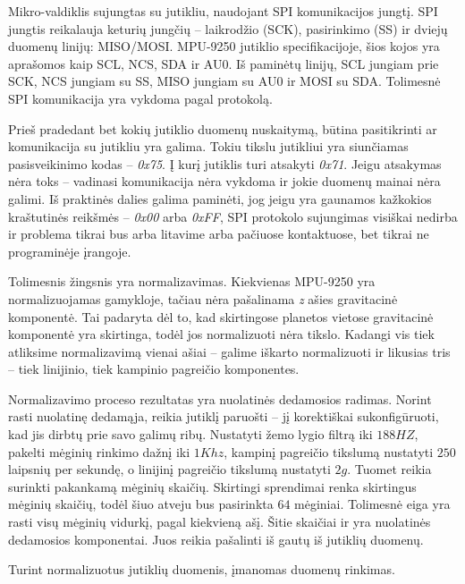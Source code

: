 Mikro-valdiklis sujungtas su jutikliu, naudojant SPI komunikacijos jungtį.
SPI jungtis reikalauja keturių jungčių -- laikrodžio (SCK), pasirinkimo (SS) ir dviejų duomenų linijų: MISO/MOSI.
MPU-9250 jutiklio specifikacijoje, šios kojos yra aprašomos kaip SCL, NCS, SDA ir AU0.
Iš paminėtų linijų, SCL jungiam prie SCK, NCS jungiam su SS, MISO jungiam su AU0 ir MOSI su SDA.
Tolimesnė SPI komunikacija yra vykdoma pagal protokolą.

Prieš pradedant bet kokių jutiklio duomenų nuskaitymą, būtina pasitikrinti ar komunikacija su jutikliu yra galima.
Tokiu tikslu jutikliui yra siunčiamas pasisveikinimo kodas -- \textit{0x75}.
Į kurį jutiklis turi atsakyti \textit{0x71}.
Jeigu atsakymas nėra toks -- vadinasi komunikacija nėra vykdoma ir jokie duomenų mainai nėra galimi.
Iš praktinės dalies galima paminėti, jog jeigu yra gaunamos kažkokios kraštutinės reikšmės -- \textit{0x00} arba \textit{0xFF}, SPI protokolo sujungimas visiškai nedirba ir problema tikrai bus arba litavime arba pačiuose kontaktuose, bet tikrai ne programinėje įrangoje.

Tolimesnis žingsnis yra normalizavimas.
Kiekvienas MPU-9250 yra normalizuojamas gamykloje, tačiau nėra pašalinama \textit{z} ašies gravitacinė komponentė.
Tai padaryta dėl to, kad skirtingose planetos vietose gravitacinė komponentė yra skirtinga, todėl jos normalizuoti nėra tikslo.
Kadangi vis tiek atliksime normalizavimą vienai ašiai -- galime iškarto normalizuoti ir likusias tris -- tiek linijinio, tiek kampinio pagreičio komponentes.

Normalizavimo proceso rezultatas yra nuolatinės dedamosios radimas.
Norint rasti nuolatinę dedamąja, reikia jutiklį paruošti -- jį korektiškai sukonfigūruoti, kad jis dirbtų prie savo galimų ribų.
Nustatyti žemo lygio filtrą iki $188 HZ$, pakelti mėginių rinkimo dažnį iki $1Khz$, kampinį pagreičio tikslumą nustatyti $250$ laipsnių per sekundę, o linijinį pagreičio tikslumą nustatyti $2g$.
Tuomet reikia surinkti pakankamą mėginių skaičių.
Skirtingi sprendimai renka skirtingus mėginių skaičių, todėl šiuo atveju bus pasirinkta $64$ mėginiai.
Tolimesnė eiga yra rasti visų mėginių vidurkį, pagal kiekvieną ašį.
Šitie skaičiai ir yra nuolatinės dedamosios komponentai. Juos reikia pašalinti iš gautų iš jutiklių duomenų.

Turint normalizuotus jutiklių duomenis, įmanomas duomenų rinkimas.
